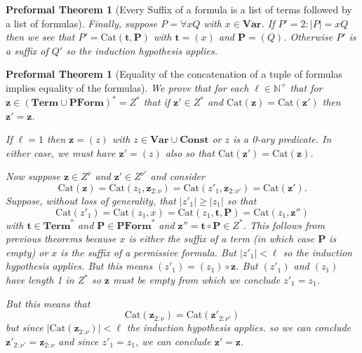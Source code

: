 \documentclass[oneside, 12pt]{book}
\theoremstyle{break}
\newtheorem{preformal definition}[definition]{Preformal Definition}
\newtheorem{preformal theorem}[theorem]{Preformal Theorem}
\newcommand{\bv}[1]{\boldsymbol{#1}}
\newcommand{\N}[0]{\mathbb{N}}
\newcommand{\norm}[1]{\left|#1\right|}
\begin{document}
\begin{preformal theorem}[Every Suffix of a formula is a list of terms followed by a list of formulas]
			Finally, suppose $P = \forall x Q$ with $x\in \textbf{Var}$.
			If $P' = 2:\norm{P} = x Q$ then we see that $P' = \text{Cat}(\bv{t}, \bv{P})$ with $\bv{t} = (x)$ and $\bv{P} = (Q)$.
			Otherwise $P'$ is a suffix of $Q'$ so the induction hypothesis applies.
		\end{preformal theorem}
		
		\begin{preformal theorem}[Equality of the concatenation of a tuple of formulas implies equality of the formulas]
			We prove that for each $\ell \in \N^+$ that for $\bv{z} \in (\textbf{Term} \cup \textbf{PForm})^* = Z^*$ that if $\bv{z}' \in Z^*$ and $\text{Cat}(\bv{z}) = \text{Cat}(\bv{z}')$ then $\bv{z}' = \bv{z}$.
			
			If $\ell = 1$ then $\bv{z} = (z)$ with $z \in \textbf{Var} \cup \textbf{Const}$ or $z$ is a 0-ary predicate.
			In either case, we must have $\bv{z}' = (z)$ also so that $\text{Cat}(\bv{z}') = \text{Cat}(\bv{z})$.
			
			Now suppose $\bv{z} \in Z^{\nu}$ and $\bv{z}' \in Z^{\nu'}$ and consider
			\begin{equation*}
				\text{Cat}(\bv{z}) = \text{Cat}(z_1, \bv{z}_{2:\nu}) = \text{Cat}(z'_1, \bv{z}_{2:\nu'}) = \text{Cat}(\bv{z}').
			\end{equation*}
			Suppose, without loss of generality, that $\norm{z'_1} \ge \norm{z_1}$ so that
			\begin{equation*}
				\text{Cat}(z'_1) = \text{Cat}(z_1, x) = \text{Cat}(z_1, \bv{t}, \bv{P}) = \text{Cat}(z_1, \bv{z}'')
			\end{equation*}
			with $\bv{t} \in \textbf{Term}^*$ and $\bv{P} \in \textbf{PForm}^*$ and $\bv{z}'' = \bv{t} \circ \bv{P} \in Z^*$.
			This follows from previous theorems because $x$ is either the suffix of a term (in which case $\bv{P}$ is empty) or $x$ is the suffix of a permissive formula.
			But $\norm{z'_1} < \ell$ so the induction hypothesis applies. But this means $(z'_1) = (z_1) \circ \bv{z}$.
			But $(z'_1)$ and $(z_1)$ have length 1 in $Z^*$ so $\bv{z}$ must be empty from which we conclude $z'_1 = z_1$.
			
			But this means that
			\begin{equation*}
				\text{Cat}(\bv{z}_{2:\nu}) = \text{Cat}(\bv{z}'_{2:\nu'})
			\end{equation*}
			but since $\norm{\text{Cat}(\bv{z}_{2:\nu})} < \ell$ the induction hypothesis applies.
			so we can conclude $\bv{z}'_{2:\nu'} = \bv{z}_{2:\nu}$ and since $z'_1 = z_1$, we can conclude $\bv{z}' = \bv{z}$.
		\end{preformal theorem}
		
\end{document}

